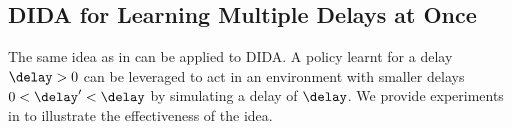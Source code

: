 \subsection{DIDA for Learning Multiple Delays at Once}
\label{subsubsec:multi_delay_once_imitation}

The same idea as in  can be applied to DIDA.
A policy learnt for a delay $\delay>0$ can be leveraged to act in an environment with smaller delays $0<\delay'<\delay$ by simulating a delay of $\delay$.
We provide experiments in  to illustrate the effectiveness of the idea. 